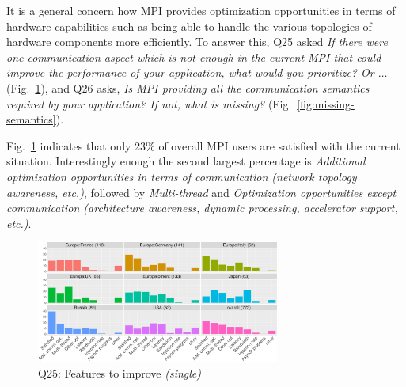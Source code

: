 \documentclass[preprint,5p,times]{elsarticle}
\def\myquote#1{{\it #1}}
\begin{document}
It is a general concern how MPI provides optimization
opportunities in terms of hardware capabilities such as being able to
handle the various topologies of hardware components more
efficiently. To answer this, Q25 asked \myquote{If there were one
communication aspect which is not enough in the current MPI that could
improve the performance of your application, what would you
prioritize? Or $\ldots$} (Fig.~\ref{fig:missing-features}), and Q26 asks,
\myquote{Is MPI providing all the communication semantics required by your
application? If not, what is missing?}
(Fig.~\ref{fig:missing-semantics}).

Fig.~\ref{fig:missing-features} indicates that only 23\% of overall MPI users
are satisfied with the current situation. Interestingly enough the second
largest percentage is \myquote{Additional optimization opportunities in terms of
communication (network topology awareness, etc.)}, followed by
\myquote{Multi-thread} and \myquote{Optimization opportunities except
communication (architecture awareness, dynamic processing, accelerator support,
etc.)}.

\begin{figure}[tb]
\begin{center}
\includegraphics[width=8.0cm]{R-scripts/Q25.pdf}
\vspace{-1.5mm}
\caption{Q25: Features to improve {\it(single)}}
\label{fig:missing-features}
\vspace{-3mm}%
\end{center}
\end{figure}
\end{document}
